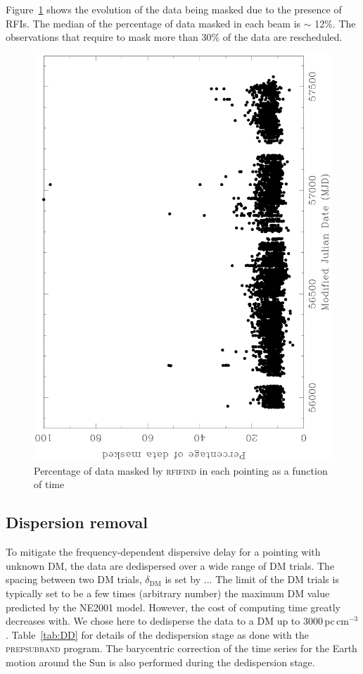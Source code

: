 \documentclass[a4paper,fleqn,usenatbib]{mnras}
\begin{document}
Figure~\ref{fig:rfi} shows the evolution of the data being masked due
to the presence of RFIs.  The median of the percentage of data masked
in each beam is $\sim$ 12\%. The observations that require to mask
more than 30\% of the data are rescheduled.

\begin{figure}
\includegraphics[height=\columnwidth,angle=-90]{plots/rfi.ps}
\caption{Percentage of data masked by \textsc{rfifind} in each pointing as a function of time}
\label{fig:rfi}
\end{figure}

\subsection{Dispersion removal}
To mitigate the frequency-dependent dispersive delay for a pointing
with unknown DM, the data are dedispersed over a wide range of DM
trials. The spacing between two DM trials, $\delta_{\text{DM}}$ is set
by ... The limit of the DM trials is typically set to be a few times
(arbitrary number) the maximum DM value predicted by the
\textsc{NE2001} model. However, the cost of computing time greatly decreases with.
We chose here to dedisperse the data to a DM up
to 3000\,pc\,cm$^{-3}$. Table~\ref{tab:DD} for details of the
dedispersion stage as done with the \textsc{prepsubband} program.  The barycentric correction of the time series for
the Earth motion around the Sun is also performed during the
dedispersion stage.
\end{document}

